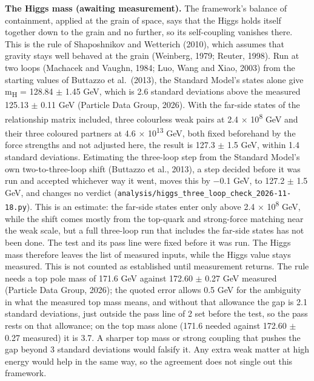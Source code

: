 \documentclass[
  11pt,
]{article}
\begin{document}
\textbf{The Higgs mass (awaiting measurement).} The framework's balance of containment, applied at the grain of space, says that the Higgs holds itself together down to the grain and no further, so its self-coupling vanishes there. This is the rule of Shaposhnikov and Wetterich (2010), which assumes that gravity stays well behaved at the grain (Weinberg, 1979; Reuter, 1998). Run at two loops (Machacek and Vaughn, 1984; Luo, Wang and Xiao, 2003) from the starting values of Buttazzo et al.~(2013), the Standard Model's states alone give m\textsubscript{H} = 128.84 \ensuremath{\pm} 1.45 GeV, which is 2.6 standard deviations above the measured 125.13 \ensuremath{\pm} 0.11 GeV (Particle Data Group, 2026). With the far-side states of the relationship matrix included, three colourless weak pairs at 2.4 \ensuremath{\times} 10\textsuperscript{8} GeV and their three coloured partners at 4.6 \ensuremath{\times} 10\textsuperscript{13} GeV, both fixed beforehand by the force strengths and not adjusted here, the result is 127.3 \ensuremath{\pm} 1.5 GeV, within 1.4 standard deviations. Estimating the three-loop step from the Standard Model's own two-to-three-loop shift (Buttazzo et al., 2013), a step decided before it was run and accepted whichever way it went, moves this by \ensuremath{-}0.1 GeV, to 127.2 \ensuremath{\pm} 1.5 GeV, and changes no verdict (\texttt{analysis/higgs\_three\_loop\_check\_2026-11-18.py}). This is an estimate: the far-side states enter only above 2.4 \ensuremath{\times} 10\textsuperscript{8} GeV, while the shift comes mostly from the top-quark and strong-force matching near the weak scale, but a full three-loop run that includes the far-side states has not been done. The test and its pass line were fixed before it was run. The Higgs mass therefore leaves the list of measured inputs, while the Higgs value stays measured. This is not counted as established until measurement returns. The rule needs a top pole mass of 171.6 GeV against 172.60 \ensuremath{\pm} 0.27 GeV measured (Particle Data Group, 2026); the quoted error allows 0.5 GeV for the ambiguity in what the measured top mass means, and without that allowance the gap is 2.1 standard deviations, just outside the pass line of 2 set before the test, so the pass rests on that allowance; on the top mass alone (171.6 needed against 172.60 \ensuremath{\pm} 0.27 measured) it is 3.7. A sharper top mass or strong coupling that pushes the gap beyond 3 standard deviations would falsify it. Any extra weak matter at high energy would help in the same way, so the agreement does not single out this framework.
\end{document}
